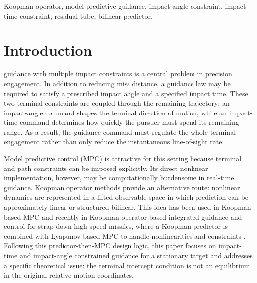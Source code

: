 \documentclass[letterpaper,journal]{IEEEtran}
\begin{document}
\begin{IEEEkeywords}
Koopman operator, model predictive guidance, impact-angle constraint, impact-time constraint, residual tube, bilinear predictor.
\end{IEEEkeywords}

\section{Introduction}
 guidance with multiple impact constraints is a central problem in precision engagement. In addition to reducing miss distance, a guidance law may be required to satisfy a prescribed impact angle and a specified impact time. These two terminal constraints are coupled through the remaining trajectory: an impact-angle command shapes the terminal direction of motion, while an impact-time command determines how quickly the pursuer must spend its remaining range. As a result, the guidance command must regulate the whole terminal engagement rather than only reduce the instantaneous line-of-sight rate.

Model predictive control (MPC) is attractive for this setting because terminal and path constraints can be imposed explicitly. Its direct nonlinear implementation, however, may be computationally burdensome in real-time guidance. Koopman operator methods provide an alternative route: nonlinear dynamics are represented in a lifted observable space in which prediction can be approximately linear or structured bilinear. This idea has been used in Koopman-based MPC and recently in Koopman-operator-based integrated guidance and control for strap-down high-speed missiles, where a Koopman predictor is combined with Lyapunov-based MPC to handle nonlinearities and constraints \cite{zhou2024klmpc}. Following this predictor-then-MPC design logic, this paper focuses on impact-time and impact-angle constrained guidance for a stationary target and addresses a specific theoretical issue: the terminal intercept condition is not an equilibrium in the original relative-motion coordinates.
\end{document}
